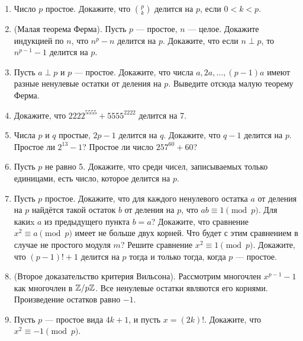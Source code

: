\begin{enumerate}
\item Число $p$ простое. Докажите, что $\binom pk$ делится на $p$, если $0 < k < p$.

\item (Малая теорема Ферма). Пусть $p$ --- простое, $n$ --- целое. \ipunkt
Докажите индукцией по $n$, что $n^p - n$ делится на $p$. \ipunkt Докажите,
что если $n\perp p$, то $n^{p-1} - 1$ делится на $p$.

\item Пусть $a\perp p$ и $p$ --- простое. \ipunkt  Докажите, что числа $a, 2a,
\dots, (p - 1)a$ имеют разные ненулевые остатки от деления на $p$. \ipunkt 
Выведите отсюда малую теорему Ферма.

\item Докажите, что $2222^{5555} + 5555^{2222}$ делится на 7.

\item \ipunkt  Числа $p$ и $q$ простые, $2p - 1$ делится на $q$. Докажите, что
$q - 1$ делится на $p$. \ipunkt  Простое ли $2^{13} - 1$? \ipunkt Простое ли число
$257^{60} + 60$?

\item Пусть $p$ не равно 5. Докажите, что среди чисел, записываемых
только единицами, есть число, которое делится на $p$.

\item Пусть $p$ простое. \ipunkt  Докажите, что для каждого ненулевого
остатка $a$ от деления на $p$ найдётся такой остаток $b$ от деления на $p$,
что $ab \equiv 1 \pmod p$. \ipunkt  Для какиx $a$ из предыдущего пункта $b = a$?
\ipunkt  Докажите, что сравнение $x^2 \equiv a \pmod p$ имеет не больше двух
корней. \ipunkt  Что будет с этим сравнением в случае не простого модуля $m$?
\ipunkt Решите сравнение $x^2 \equiv 1 \pmod p$. 
 Докажите, что $(p - 1)! + 1$ делится на $p$ тогда и только тогда,
когда $p$ --- простое.

\item (Второе доказательство критерия Вильсона). Рассмотрим многочлен
 $x^{p-1} - 1$ как многочлен в $\mathbb Z/p\mathbb Z$. \ipunkt Все ненулевые остатки
являются его корнями. \ipunkt Произведение остатков равно $-1$.

\item Пусть $p$ --- простое вида $4k + 1$, и пусть $x = (2k)!$. Докажите,
что $x^2 \equiv -1 \pmod p$.



\end{enumerate}







